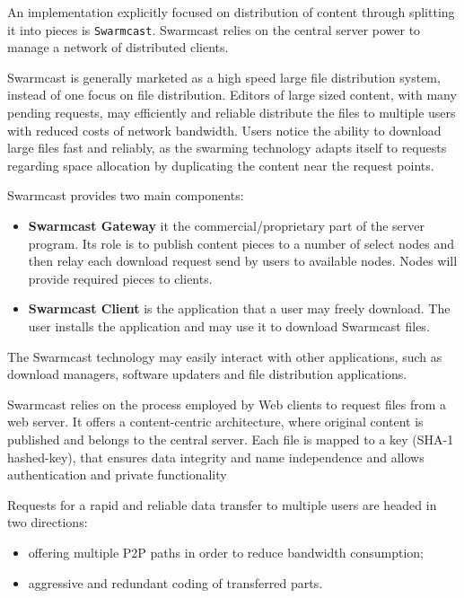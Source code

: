 An implementation explicitly focused on distribution of content through
splitting it into pieces is \texttt{Swarmcast}. Swarmcast relies on the
central server power to manage a network of distributed clients.

Swarmcast is generally marketed as a high speed large file distribution
system, instead of one focus on file distribution. Editors of large sized
content, with many pending requests, may efficiently and reliable distribute
the files to multiple users with reduced costs of network bandwidth. Users
notice the ability to download large files fast and reliably, as the swarming
technology adapts itself to requests regarding space allocation by duplicating
the content near the request points.

Swarmcast provides two main components:

\begin{itemize}
  \item \textbf{Swarmcast Gateway} it the commercial/proprietary part of the
  server program. Its role is to publish content pieces to a number of select
  nodes and then relay each download request send by users to available nodes.
  Nodes will provide required pieces to clients.
  \item \textbf{Swarmcast Client} is the application that a user may freely
  download. The user installs the application and may use it to download
  Swarmcast files.
\end{itemize}

The Swarmcast technology may easily interact with other applications, such as
download managers, software updaters and file distribution applications.

Swarmcast relies on the process employed by Web clients to request files from
a web server. It offers a content-centric architecture, where original content
is published and belongs to the central server. Each file is mapped to a key
(SHA-1 hashed-key), that ensures data integrity and name independence and
allows authentication and private functionality

Requests for a rapid and reliable data transfer to multiple users are headed
in two directions:

\begin{itemize}
  \item offering multiple P2P paths in order to reduce bandwidth consumption;
  \item aggressive and redundant coding of transferred parts.
\end{itemize}

